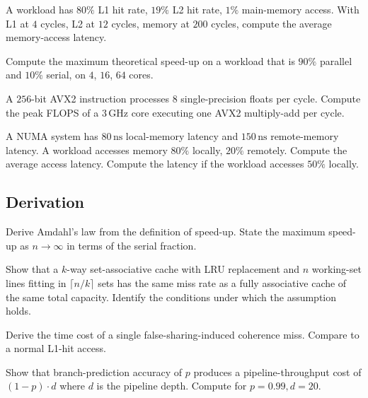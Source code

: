 \begin{exercise}
A workload has $80\%$ L1 hit rate, $19\%$ L2 hit rate, $1\%$ main-memory access. With L1 at $4$ cycles, L2 at $12$ cycles, memory at $200$ cycles, compute the average memory-access latency.
\end{exercise}

\begin{exercise}
Compute the maximum theoretical speed-up on a workload that is $90\%$ parallel and $10\%$ serial, on $4$, $16$, $64$ cores.
\end{exercise}

\begin{exercise}
A $256$-bit AVX2 instruction processes $8$ single-precision floats per cycle. Compute the peak FLOPS of a $3\,\si{\giga\hertz}$ core executing one AVX2 multiply-add per cycle.
\end{exercise}

\begin{exercise}
A NUMA system has $80\,\si{\nano\second}$ local-memory latency and $150\,\si{\nano\second}$ remote-memory latency. A workload accesses memory $80\%$ locally, $20\%$ remotely. Compute the average access latency. Compute the latency if the workload accesses $50\%$ locally.
\end{exercise}

\subsection*{Derivation}

\begin{exercise}
Derive Amdahl's law from the definition of speed-up. State the maximum speed-up as $n \to \infty$ in terms of the serial fraction.
\end{exercise}

\begin{exercise}
Show that a $k$-way set-associative cache with LRU replacement and $n$ working-set lines fitting in $\lceil n/k \rceil$ sets has the same miss rate as a fully associative cache of the same total capacity. Identify the conditions under which the assumption holds.
\end{exercise}

\begin{exercise}
Derive the time cost of a single false-sharing-induced coherence miss. Compare to a normal L1-hit access.
\end{exercise}

\begin{exercise}
Show that branch-prediction accuracy of $p$ produces a pipeline-throughput cost of $(1-p) \cdot d$ where $d$ is the pipeline depth. Compute for $p = 0.99, d = 20$.
\end{exercise}

